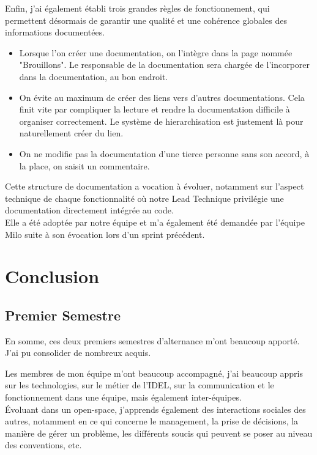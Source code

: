\documentclass{article}
\begin{document}
Enfin, j'ai également établi trois grandes règles de fonctionnement, qui permettent désormais de garantir une qualité et une cohérence globales des informations documentées.

\begin{itemize}
    \item Lorsque l'on créer une documentation, on l'intègre dans la page nommée "Brouillons". Le responsable de la documentation sera chargée de l'incorporer dans la documentation, au bon endroit.
    \item On évite au maximum de créer des liens vers d'autres documentations. Cela finit vite par compliquer la lecture et rendre la documentation difficile à organiser correctement. Le système de hierarchisation est justement là pour naturellement créer du lien.
    \item On ne modifie pas la documentation d'une tierce personne sans son accord, à la place, on saisit un commentaire.
\end{itemize}

Cette structure de documentation a vocation à évoluer, notamment sur l'aspect technique de chaque fonctionnalité où notre Lead Technique privilégie une documentation directement intégrée au code. \\

Elle a été adoptée par notre équipe et m'a également été demandée par l'équipe Milo suite à son évocation lors d'un sprint précédent.

\newpage
\section{Conclusion}

\subsection{ Premier Semestre}

En somme, ces deux premiers semestres d'alternance m'ont beaucoup apporté. J'ai pu consolider de nombreux acquis.

Les membres de mon équipe m'ont beaucoup accompagné, j'ai beaucoup appris sur les technologies, sur le métier de l'IDEL, sur la communication et le fonctionnement dans une équipe, mais également inter-équipes.\\

Évoluant dans un open-space, j'apprends également des interactions sociales des autres, notamment en ce qui concerne le management, la prise de décisions, la manière de gérer un problème, les différents soucis qui peuvent se poser au niveau des conventions, etc. 
\end{document}
